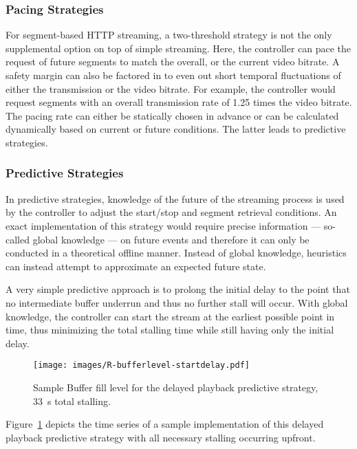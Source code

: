 \subsubsection{Pacing Strategies}

For segment-based \gls{HTTP} streaming, a two-threshold strategy is not the only supplemental option on top of simple streaming. Here, the controller can pace the request of future segments to match the overall, or the current video bitrate. A safety margin can also be factored in to even out short temporal fluctuations of either the transmission or the video bitrate. For example, the controller would request segments with an overall transmission rate of 1.25 times the video bitrate. The pacing rate can either be statically chosen in advance or can be calculated dynamically based on current or future conditions. The latter leads to predictive strategies.


\subsubsection{Predictive Strategies}

In predictive strategies, knowledge of the future of the streaming process is used by the controller to adjust the start/stop and segment retrieval conditions. An exact implementation of this strategy would require precise information --- so-called global knowledge --- on future events and therefore it can only be conducted in a theoretical offline manner. Instead of global knowledge, heuristics can instead attempt to approximate an expected future state.

A very simple predictive approach is to prolong the initial delay to the point that no intermediate buffer underrun and thus no further stall will occur. With global knowledge, the controller can start the stream at the earliest possible point in time, thus minimizing the total stalling time while still having only the initial delay.

\begin{figure}[htb]
	\centering
	\texttt{[image: images/R-bufferlevel-startdelay.pdf]}
	\caption{Sample Buffer fill level for the delayed playback predictive strategy, \SI{33}{\second} total stalling.}
\label{c3:fig:bufferlevel-startdelay}
\end{figure}

Figure~\ref{c3:fig:bufferlevel-startdelay} depicts the time series of a sample implementation of this delayed playback predictive strategy with all necessary stalling occurring upfront.


